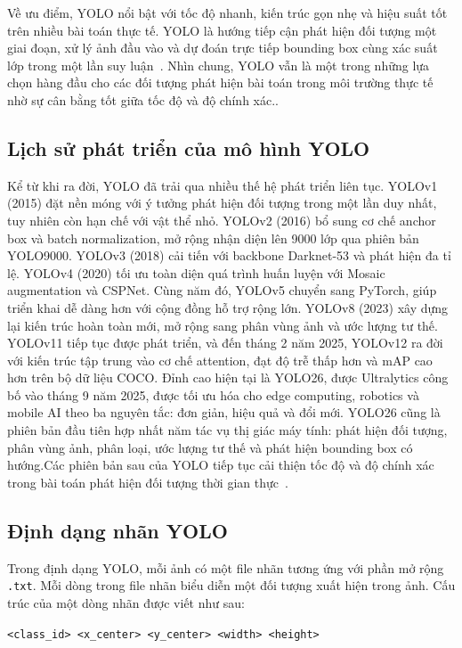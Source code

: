 \documentclass[13pt,a4paper]{report}
\begin{document}
Về ưu điểm, YOLO nổi bật với tốc độ nhanh, kiến ​​trúc gọn nhẹ và hiệu suất tốt trên nhiều bài toán thực tế. YOLO là hướng tiếp cận phát hiện đối tượng một giai đoạn, xử lý ảnh đầu vào và dự đoán trực tiếp bounding box cùng xác suất lớp trong một lần suy luận~\cite{redmon2016yolo}. Nhìn chung, YOLO vẫn là một trong những lựa chọn hàng đầu cho các đối tượng phát hiện bài toán trong môi trường thực tế nhờ sự cân bằng tốt giữa tốc độ và độ chính xác..
\subsection{Lịch sử phát triển của mô hình YOLO}

Kể từ khi ra đời, YOLO đã trải qua nhiều thế hệ phát triển liên tục. YOLOv1 (2015) đặt nền móng với ý tưởng phát hiện đối tượng trong một lần duy nhất, tuy nhiên còn hạn chế với vật thể nhỏ. YOLOv2 (2016) bổ sung cơ chế anchor box và batch normalization, mở rộng nhận diện lên 9000 lớp qua phiên bản YOLO9000. YOLOv3 (2018) cải tiến với backbone Darknet-53 và phát hiện đa tỉ lệ. YOLOv4 (2020) tối ưu toàn diện quá trình huấn luyện với Mosaic augmentation và CSPNet. Cùng năm đó, YOLOv5 chuyển sang PyTorch, giúp triển khai dễ dàng hơn với cộng đồng hỗ trợ rộng lớn. YOLOv8 (2023) xây dựng lại kiến trúc hoàn toàn mới, mở rộng sang phân vùng ảnh và ước lượng tư thế. YOLOv11 tiếp tục được phát triển, và đến tháng 2 năm 2025, YOLOv12 ra đời với kiến trúc tập trung vào cơ chế attention, đạt độ trễ thấp hơn và mAP cao hơn trên bộ dữ liệu COCO. Đỉnh cao hiện tại là YOLO26, được Ultralytics công bố vào tháng 9 năm 2025, được tối ưu hóa cho edge computing, robotics và mobile AI theo ba nguyên tắc: đơn giản, hiệu quả và đổi mới. YOLO26 cũng là phiên bản đầu tiên hợp nhất năm tác vụ thị giác máy tính: phát hiện đối tượng, phân vùng ảnh, phân loại, ước lượng tư thế và phát hiện bounding box có hướng.Các phiên bản sau của YOLO tiếp tục cải thiện tốc độ và độ chính xác trong bài toán phát hiện đối tượng thời gian thực~\cite{bochkovskiy2020yolov4}.


\subsection{Định dạng nhãn YOLO}

Trong định dạng YOLO, mỗi ảnh có một file nhãn tương ứng với phần mở rộng \texttt{.txt}. Mỗi dòng trong file nhãn biểu diễn một đối tượng xuất hiện trong ảnh. Cấu trúc của một dòng nhãn được viết như sau:

\begin{center}
	\texttt{<class\_id> <x\_center> <y\_center> <width> <height>}
\end{center}
\end{document}
